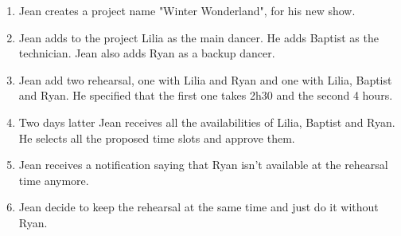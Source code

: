 \documentclass[11pt]{article}
\begin{document}
\begin{enumerate}
    \item Jean creates a project name "Winter Wonderland", for his new show.
    \item Jean adds to the project Lilia as the main dancer. He adds Baptist as the technician. Jean also adds Ryan as a backup dancer.
    \item Jean add two rehearsal, one with Lilia and Ryan and one with Lilia, Baptist and Ryan. He specified that the first one takes 2h30 and the second 4 hours.
    \item Two days latter Jean receives all the availabilities of Lilia, Baptist and Ryan. He selects all the proposed time slots and approve them.
    \item Jean receives a notification saying that Ryan isn't available at the rehearsal time anymore.
    \item Jean decide to keep the rehearsal at the same time and just do it without Ryan.
\end{enumerate}

\newpage
\end{document}
